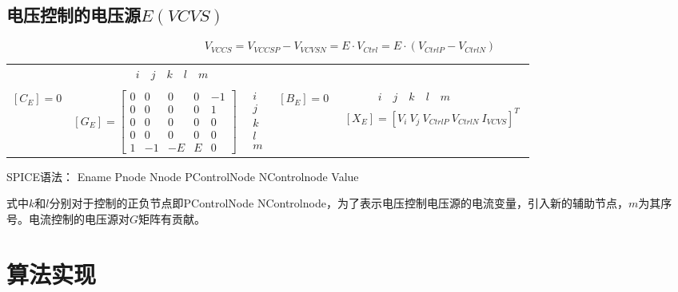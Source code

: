 \documentclass[12pt]{article}
\begin{document}
\subsection{电压控制的电压源$E(VCVS)$}
\begin{equation*}
  V_{VCCS}=V_{VCCSP} - V_{VCVSN}=E·V_{Ctrl}=E·\left(V_{CtrlP} - V_{CtrlN}\right)
\end{equation*}
\begin{table}[H]
  \centering\renewcommand{}
  \begin{tabular}{ccccc}
   & $ \qquad \quad i \quad j \quad k \quad l \quad m$ & & & \\                            \\
  $\left[C_{E}\right]=0$ & 
  $\left[G_{E}\right]=\left[\begin{array}{ccccc} 0 & 0 & 0 & 0 & -1 \\ 0 & 0 & 0 & 0 & 1 \\ 0 & 0 & 0 & 0 & 0 \\ 0 & 0 & 0 & 0 & 0\\ 1 & -1 & -E & E & 0\end{array}\right]$  & 
  $\begin{array}{c} i \\ j \\ k \\ l \\m\end{array}$ &
  $\left[B_{E}\right]=0$ & 
  $\begin{array}{c} \qquad \quad i \quad j \quad k \quad l \quad m\\ \left[X_{E}\right]=\left[ V_{i}\ V_{j}\ V_{CtrlP}\ V_{CtrlN}\ I_{VCVS}\right]^T \end{array}$ \\
  \end{tabular}
\end{table}
\qquad SPICE语法： Ename Pnode Nnode PControlNode NControlnode Value\par
\qquad 式中$k$和$l$分别对于控制的正负节点即PControlNode NControlnode，为了表示电压控制电压源的电流变量，引入新的辅助节点，$m$为其序号。电流控制的电压源对$G$矩阵有贡献。\par

\section{算法实现}
\end{document}
